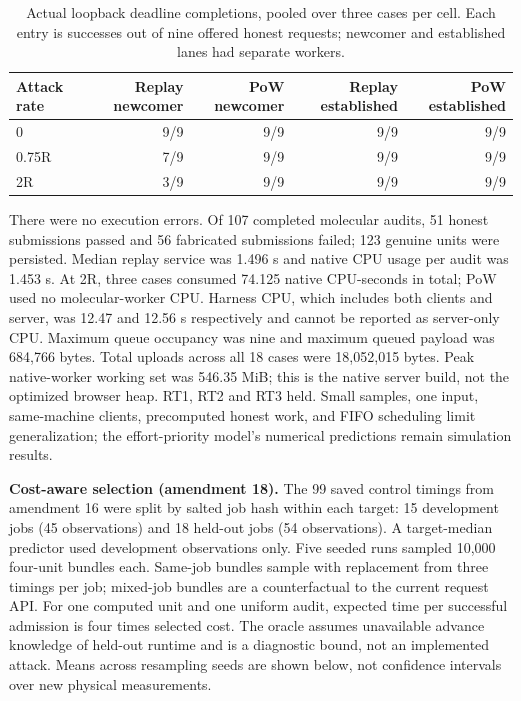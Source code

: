 \documentclass[11pt]{article}
\newcommand{\botrule}{\bottomrule}
\begin{document}
\begin{table}[htbp]
\caption{Actual loopback deadline completions, pooled over three cases per cell. Each entry is successes out of nine offered honest requests; newcomer and established lanes had separate workers.}
\centering
\small
\begin{tabularx}{\textwidth}{Xrrrr}
\toprule
Attack rate & Replay newcomer & PoW newcomer & Replay established & PoW established \\
\midrule
0 & 9/9 & 9/9 & 9/9 & 9/9 \\
0.75R & 7/9 & 9/9 & 9/9 & 9/9 \\
2R & 3/9 & 9/9 & 9/9 & 9/9 \\
\botrule
\end{tabularx}
\end{table}

There were no execution errors. Of 107 completed molecular audits, 51 honest submissions passed and 56 fabricated submissions failed; 123 genuine units were persisted. Median replay service was 1.496 s and native CPU usage per audit was 1.453 s. At 2R, three cases consumed 74.125 native CPU-seconds in total; PoW used no molecular-worker CPU. Harness CPU, which includes both clients and server, was 12.47 and 12.56 s respectively and cannot be reported as server-only CPU. Maximum queue occupancy was nine and maximum queued payload was 684,766 bytes. Total uploads across all 18 cases were 18,052,015 bytes. Peak native-worker working set was 546.35 MiB; this is the native server build, not the optimized browser heap. RT1, RT2 and RT3 held. Small samples, one input, same-machine clients, precomputed honest work, and FIFO scheduling limit generalization; the effort-priority model's numerical predictions remain simulation results.

\textbf{Cost-aware selection (amendment 18).} The 99 saved control timings from amendment 16 were split by salted job hash within each target: 15 development jobs (45 observations) and 18 held-out jobs (54 observations). A target-median predictor used development observations only. Five seeded runs sampled 10,000 four-unit bundles each. Same-job bundles sample with replacement from three timings per job; mixed-job bundles are a counterfactual to the current request API. For one computed unit and one uniform audit, expected time per successful admission is four times selected cost. The oracle assumes unavailable advance knowledge of held-out runtime and is a diagnostic bound, not an implemented attack. Means across resampling seeds are shown below, not confidence intervals over new physical measurements.
\end{document}
